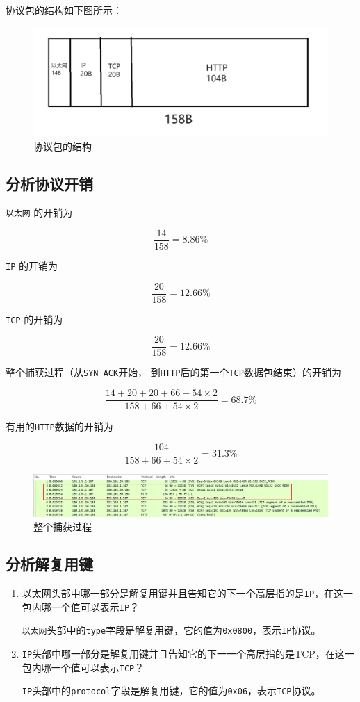 \documentclass{article}
\begin{document}
协议包的结构如下图所示：

\begin{figure}[H]
  \centering
  \includegraphics[width=15cm]{images/10.png}
  \caption{协议包的结构}
\end{figure}

\subsection{分析协议开销}

\texttt{以太网} 的开销为

$$
  \frac{14}{158}=8.86\%
$$

\texttt{IP} 的开销为

$$
  \frac{20}{158}=12.66\%
$$

\texttt{TCP} 的开销为

$$
  \frac{20}{158}=12.66\%
$$

整个捕获过程（从\texttt{SYN ACK}开始，
到\texttt{HTTP}后的第一个\texttt{TCP}数据包结束）的开销为

$$
  \frac{14+20+20+ 66 + 54 \times 2}{158 + 66 + 54 \times 2}= 68.7\%
$$

有用的\texttt{HTTP}数据的开销为

$$
  \frac{104}{158 + 66 + 54 \times 2}= 31.3\%
$$

\begin{figure}[H]
  \centering
  \includegraphics[width=15cm]{images/11.png}
  \caption{整个捕获过程}
\end{figure}

\subsection{分析解复用键}

\begin{enumerate}[noitemsep]
  \item 以太网头部中哪一部分是解复用键并且告知它的下一个高层指的是\texttt{IP}，在这一包内哪一个值可以表示\texttt{IP}？

        \texttt{以太网}头部中的\texttt{type}字段是解复用键，它的值为\texttt{0x0800}，表示\texttt{IP}协议。

  \item \texttt{IP}头部中哪一部分是解复用键并且告知它的下一一个高层指的是TCP，在这一包内哪一个值可以表示\texttt{TCP}？

        \texttt{IP}头部中的\texttt{protocol}字段是解复用键，它的值为\texttt{0x06}，表示\texttt{TCP}协议。
\end{enumerate}
\end{document}
